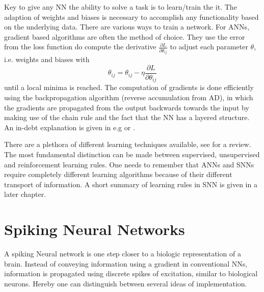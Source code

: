 Key to give any \ac{NN} the ability to solve a task is to learn/train the it. The adaption of weights and biases is necessary to accomplish any functionality based on the underlying data\cite{zheng_introductory_2022}. There are various ways to train a network. For \acp{ANN}, gradient based algorithms are often the method of choice. They use the error from the loss function do compute the derivative $\frac{\partial L}{\partial \theta_{ij}}$ to adjust each parameter $\theta$, i.e. weights and biases with
 \begin{equation}
 	\theta_{ij} = \theta_{ij} - \eta \frac{\partial L}{\partial \theta_{ij}}
 \end{equation}
 until a local minima is reached. The computation of gradients is done efficiently using the backpropagation algorithm (reverse accumulation from \ac{AD}), in which the gradients are propagated from the output backwards towards the input by making use of the chain rule and the fact that the \ac{NN} has a layered structure. An in-debt explanation is given in e.g \cite{goodfellow_deep_2016} or \cite{nielsen_neural_2015}.


 There are a plethora of different learning techniques available, see \cite{abdolrasol_artificial_2021}\cite{sun_survey_2019} for a review. The most fundamental distinction can be made between supervised, unsupervised and reinforcement learning rules.
 One needs to remember that \acp{ANN} and \acp{SNN} require completely different learning algorithms because of their different transport of information. A short summary of learning rules in \ac{SNN} is given in a later chapter.\\

\section{Spiking Neural Networks}
A spiking Neural network is one step closer to a biologic representation of a brain. Instead of conveying information using a gradient in conventional \ac{NN}s, information is propagated using discrete spikes of excitation, similar to biological neurons. Hereby one can distinguish between several ideas of implementation.

